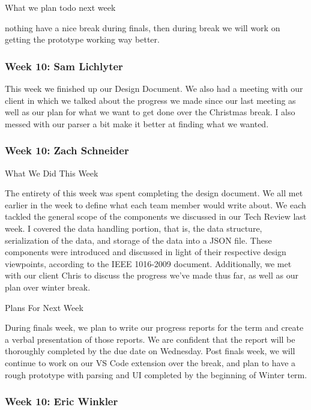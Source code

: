 What we plan todo next week



nothing have a nice break during finals, then during break we will work on getting the prototype working way better. \\ 

 \subsubsection{Week 10: Sam Lichlyter}

This week we finished up our Design Document. We also had a meeting with our client in which we talked about the progress we made since our last meeting as well as our plan for what we want to get done over the Christmas break. I also messed with our parser a bit make it better at finding what we wanted. \\ 

 \subsubsection{Week 10: Zach Schneider}

What We Did This Week

The entirety of this week was spent completing the design document. We all met earlier in the week to define what each team member would write about. We each tackled the general scope of the components we discussed in our Tech Review last week. I covered the data handling portion, that is, the data structure, serialization of the data, and storage of the data into a JSON file. These components were introduced and discussed in light of their respective design viewpoints, according to the IEEE 1016-2009 document. Additionally, we met with our client Chris to discuss the progress we've made thus far, as well as our plan over winter break.



Plans For Next Week

During finals week, we plan to write our progress reports for the term and create a verbal presentation of those reports. We are confident that the report will be thoroughly completed by the due date on Wednesday. Post finals week, we will continue to work on our VS Code extension over the break, and plan to have a rough prototype with parsing and UI completed by the beginning of Winter term. \\ 

 \subsubsection{Week 10: Eric Winkler}

